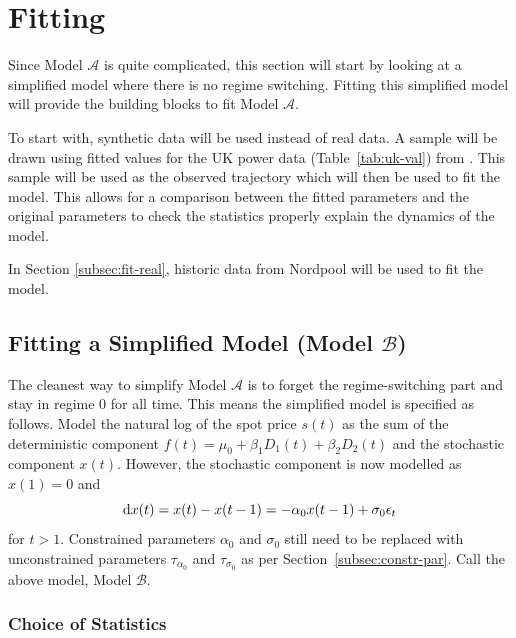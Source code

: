 \section{Fitting}
\label{sec:fitting}
Since Model $\mathcal{A}$ is quite complicated, this section will start by looking at a simplified model where there is no regime switching. Fitting this simplified model will provide the building blocks to fit Model $\mathcal{A}$.

To start with, synthetic data will be used instead of real data. A sample will be drawn using fitted values  for the UK power data (Table~\ref{tab:uk-val}) from \cite{huisman_mahieu_2003}. This sample will be used as the observed trajectory which will then be used to fit the model. This allows for a comparison between the fitted parameters and the original parameters to check the statistics properly explain the dynamics of the model.

In Section \ref{subsec:fit-real}, historic data from Nordpool will be used to fit the model.

\subsection{Fitting a Simplified Model (Model \texorpdfstring{$\mathcal{B}$}{B})}
The cleanest way to simplify Model $\mathcal{A}$ is to forget the regime-switching part and stay in regime $0$ for all time. This means the simplified model is specified as follows. Model the natural log of the spot price $s(t)$ as the sum of the deterministic component $f(t) = \mu_0 + \beta_1 D_1(t) + \beta_2 D_2(t)$ and the stochastic component $x(t)$. However, the stochastic component is now modelled as $x(1) = 0$ and
\begin{equation}
    \mathop{}\!\mathrm{d}{x(t)} = x(t) - x(t-1) = -\alpha_0 x(t-1) + \sigma_0 \epsilon_t
\end{equation}
for $t > 1$. Constrained parameters $\alpha_0$ and $\sigma_0$ still need to be replaced with unconstrained parameters $\tau_{\alpha_0}$ and $\tau_{\sigma_0}$ as per Section~\ref{subsec:constr-par}. Call the above model, Model $\mathcal{B}$.

\subsubsection{Choice of Statistics}

